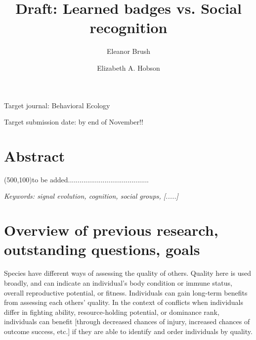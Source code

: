 

\noindent
\title{Draft: Learned badges vs. Social recognition} 

\author[1]{Eleanor Brush}
\author[2,3,4]{Elizabeth A. Hobson}
\maketitle

Target journal: Behavioral Ecology 

Target submission date: by end of November!!
\linenumbers

\section*{Abstract}

\framebox(500,100){to be added..........................................}

\textit{Keywords: signal evolution, cognition, social groups, [.....]}
\newline

\section*{Overview of previous research, outstanding questions, goals} 

Species have different ways of assessing the quality of others. Quality here is used broadly, and can indicate an individual's body condition or immune status, overall reproductive potential, or fitness. Individuals can gain long-term benefits from assessing each others' quality. In the context of conflicts when individuals differ in fighting ability, resource-holding potential, or dominance rank, individuals can benefit [through decreased chances of injury, increased chances of outcome success, etc.] if they are able to identify and order individuals by quality. 

